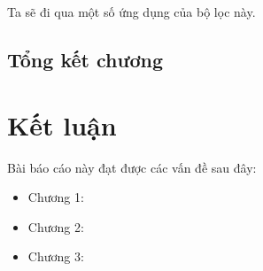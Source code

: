 \documentclass[12pt,a4paper]{report}
\numberwithin{equation}{section}
\theoremstyle{definition} %
\begin{document}
Ta sẽ đi qua một số ứng dụng của bộ lọc này.

\section{Tổng kết chương}

	\chapter*{Kết luận}                         %
	\indent
	\thispagestyle{fancy}
	

Bài báo cáo này đạt được các vấn đề sau đây:
	
	\begin{itemize}
	\item Chương 1:
	

	
	\item Chương 2:

	
	\item Chương 3: 
	

	
	\end{itemize}
	
\end{document}
